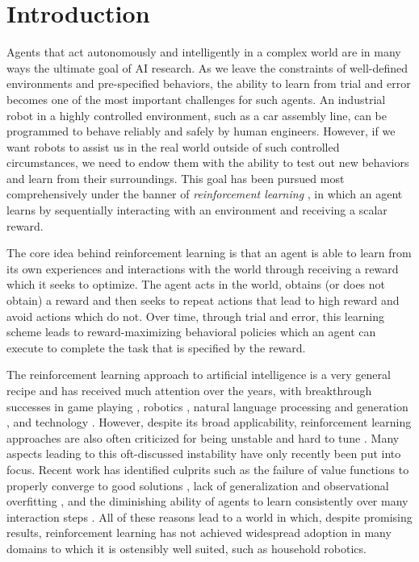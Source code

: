 \chapter{Introduction}

Agents that act autonomously and intelligently in a complex world are in many ways the ultimate goal of AI research.
As we leave the constraints of well-defined environments and pre-specified behaviors, the ability to learn from trial and error becomes one of the most important challenges for such agents.
An industrial robot in a highly controlled environment, such as a car assembly line, can be programmed to behave reliably and safely by human engineers.
However, if we want robots to assist us in the real world outside of such controlled circumstances, we need to endow them with the ability to test out new behaviors and learn from their surroundings.
This goal has been pursued most comprehensively under the banner of \emph{reinforcement learning} \parencite{suttonbook}, in which an agent learns by sequentially interacting with an environment and receiving a scalar reward.

The core idea behind reinforcement learning is that an agent is able to learn from its own experiences and interactions with the world through receiving a reward which it seeks to optimize.
The agent acts in the world, obtains (or does not obtain) a reward and then seeks to repeat actions that lead to high reward and avoid actions which do not.
Over time, through trial and error, this learning scheme leads to reward-maximizing behavioral policies which an agent can execute to complete the task that is specified by the reward.

The reinforcement learning approach to artificial intelligence is a very general recipe and has received much attention over the years, with breakthrough successes in game playing \parencite{mnih2013playing,silver2016mastering}, robotics \parencite{smith2023demonstrating}, natural language processing and generation \parencite{ouyang2022training,rafailov2023direct,bi2024deepseek}, and technology \parencite{degrave2022magnetic}.
However, despite its broad applicability, reinforcement learning approaches are also often criticized for being unstable and hard to tune \parencite{irpan2018deep,henderson2018deep,patterson2024empirical}.
Many aspects leading to this oft-discussed instability have only recently been put into focus.
Recent work has identified culprits such as the failure of value functions to properly converge to good solutions \parencite{kumar2021implicit}, lack of generalization and observational overfitting \parencite{song2020observational,kirk2023survey}, and the diminishing ability of agents to learn consistently over many interaction steps \parencite{nikishin2022primacy,hussing2024dissecting}.
All of these reasons lead to a world in which, despite promising results, reinforcement learning has not achieved widespread adoption in many domains to which it is ostensibly well suited, such as household robotics.


